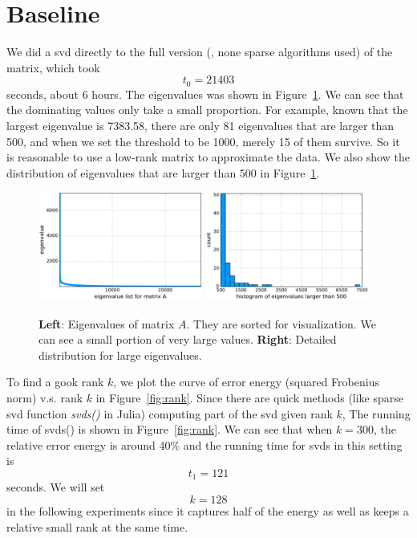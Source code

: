 \section{Baseline}

We did a svd directly to the full version
(\ie, none sparse algorithms used) of the matrix,
which took
\begin{equation}
    t_0=21403
\end{equation}
 seconds, about $6$ hours.
The eigenvalues was shown in Figure~\ref{fig:eig}.
We can see that the dominating values only take a small proportion.
For example,
known that the largest eigenvalue is 7383.58,
there are only 81 eigenvalues that are larger than 500,
and when we set the threshold to be 1000,
merely 15 of them survive.
So it is reasonable to use a low-rank matrix to approximate the data.
We also show the distribution of eigenvalues that are larger than 500
in Figure~\ref{fig:eig}.

\begin{figure}[!ht]
	\centering
	\includegraphics[width=0.48\textwidth]{fig/eigs.pdf}
    \hskip 0.2cm
	\includegraphics[width=0.48\textwidth]{fig/eig_large.pdf}
	\caption{\small
  		\textbf{Left}: Eigenvalues of matrix $A$.
          They are sorted for visualization.
          We can see a small portion of very large values.
        \textbf{Right}: Detailed distribution for large eigenvalues.}
	\label{fig:eig}
\end{figure}

To find a gook rank $k$,
we plot the curve of error energy (squared Frobenius norm) v.s. rank $k$
in Figure~\ref{fig:rank}.
Since there are quick methods (like sparse svd function \textit{svds()} in Julia)
computing part of the svd given rank $k$,
The running time of svds() is shown in Figure~\ref{fig:rank}.
We can see that when $k=300$,
the relative error energy is around 40\% and
the running time for svds in this setting is
\begin{equation}
    t_1=121
\end{equation}
seconds.
We will set
\begin{equation}
    k=128
\end{equation}
in the following experiments since it captures half of the energy
as well as keeps a relative small rank at the same time.

